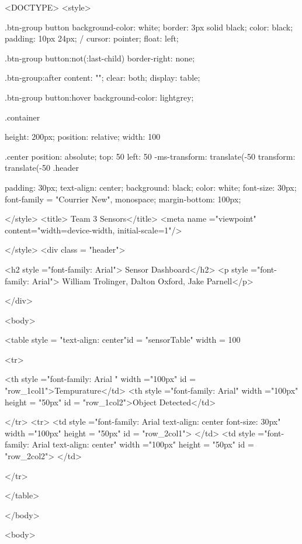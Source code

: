 <DOCTYPE>
	<style>
	
.btn-group button {
  background-color: white;
  border: 3px solid black; 
  color: black; 
  padding: 10px 24px; /
  cursor: pointer; 
  float: left; 
}

.btn-group button:not(:last-child) {
  border-right: none;
}


.btn-group:after {
  content: "";
  clear: both;
  display: table;
}


.btn-group button:hover {
  background-color: lightgrey;
}

.container { 
  height: 200px;
  position: relative;
  width: 100%
  
}

.center {
  position: absolute;
  top: 50%
  left: 50%
  -ms-transform: translate(-50%
  transform: translate(-50%
}
.header{
	
padding: 30px;
text-align: center;
background: black;
color: white;
font-size: 30px;
font-family = "Courrier New", monospace;
margin-bottom: 100px;

	
}


</style>
<title> Team 3 Sensors</title>
<meta name ="viewpoint" content="width=device-width, initial-scale=1"/>

	
	
	</style>
	<div class = "header">

	<h2 style ="font-family: Arial"> Sensor Dashboard</h2>
	<p style ="font-family: Arial"> William Trolinger, Dalton Oxford, Jake Parnell</p>
	
	
	</div>
	

<body>
		
		
	<table style =  "text-align: center"id = "sensorTable" width = 100%
		
		<tr>
			
			<th style ="font-family: Arial " width ="100px" id = "row_1col1">Tempurature</td>
			<th  style ="font-family: Arial" width ="100px" height = "50px" id = "row_1col2">Object Detected</td>
			
			
		</tr>
		<tr>
			<td  style ="font-family: Arial text-align: center font-size: 30px" width ="100px" height = "50px" id = "row_2col1"> </td>
			<td  style ="font-family: Arial text-align: center" width ="100px" height = "50px" id = "row_2col2"> </td>
		
		</tr>
	
	</table>
	
	
</body>


	
	
<body>  
	

